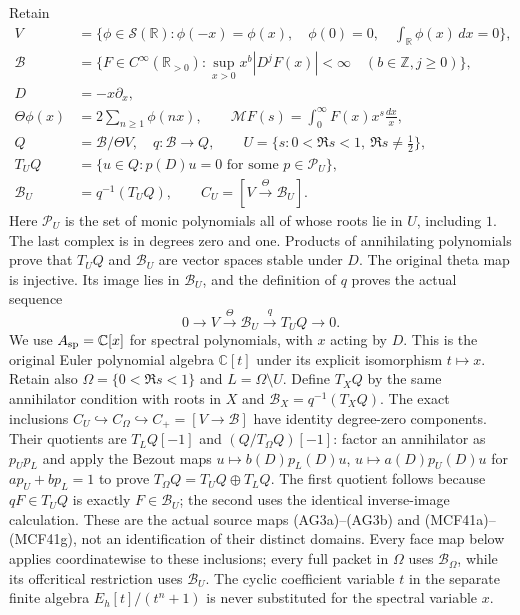 Retain
\[
\begin{split}
 V&=\{\phi\in\mathcal S(\mathbb R):\phi(-x)=\phi(x),\quad
       \phi(0)=0,\quad\textstyle\int_{\mathbb R}\phi(x)\,dx=0\},\\
 \mathscr B&=\{F\in C^\infty(\mathbb R_{>0}):
       \sup_{x>0}x^b|D^jF(x)|<\infty\quad(b\in\mathbb Z,j\ge0)\},\\
 D&=-x\partial_x,\\
 \Theta\phi(x)&=2\sum_{n\ge1}\phi(nx),\qquad
 \mathcal MF(s)=\int_0^\infty F(x)x^s\frac{dx}{x},\\
 Q&=\mathscr B/\Theta V,\quad q:\mathscr B\to Q,\qquad
 U=\{s:0<\Re s<1,\ \Re s\ne\tfrac12\},\\
 T_UQ&=\{u\in Q:p(D)u=0\text{ for some }p\in\mathcal P_U\},\\
 \mathscr B_U&=q^{-1}(T_UQ),\qquad C_U=[V\xrightarrow{\Theta}\mathscr B_U].
\end{split}                                                     \tag{CFA.1}
\]
Here $\mathcal P_U$ is the set of monic polynomials all of whose roots
lie in $U$, including $1$.  The last complex is in degrees zero and one.
Products of annihilating polynomials prove that $T_UQ$ and
$\mathscr B_U$ are vector spaces stable under $D$.  The original
theta map is injective.  Its image lies in $\mathscr B_U$, and the
definition of $q$ proves the actual sequence
\[
 0\longrightarrow V\xrightarrow{\Theta}\mathscr B_U
           \xrightarrow{q}T_UQ\longrightarrow0.                \tag{CFA.2}
\]
We use $A_{\rm sp}=\mathbb C[x]$ for spectral polynomials, with $x$
acting by $D$.  This is the original Euler polynomial algebra
$\mathbb C[t]$ under its explicit isomorphism $t\mapsto x$.
Retain also $\Omega=\{0<\Re s<1\}$ and
$L=\Omega\setminus U$. Define $T_XQ$ by the same annihilator
condition with roots in $X$ and $\mathscr B_X=q^{-1}(T_XQ)$.
The exact inclusions $C_U\hookrightarrow C_\Omega\hookrightarrow
C_+=[V\to\mathscr B]$ have identity degree-zero components.
Their quotients are $T_LQ[-1]$ and $(Q/T_\Omega Q)[-1]$:
factor an annihilator as $p_Up_L$ and apply the Bezout maps
$u\mapsto b(D)p_L(D)u$, $u\mapsto a(D)p_U(D)u$ for
$ap_U+bp_L=1$ to prove $T_\Omega Q=T_UQ\oplus T_LQ$.
The first quotient follows because $qF\in T_UQ$ is exactly
$F\in\mathscr B_U$; the second uses the identical inverse-image
calculation. These are the actual source maps (AG3a)--(AG3b) and
(MCF41a)--(MCF41g), not an identification of their distinct domains.
Every face map below applies coordinatewise to these inclusions;
every full packet in $\Omega$ uses $\mathscr B_\Omega$, while its
offcritical restriction uses $\mathscr B_U$.
The cyclic coefficient variable $t$ in the separate finite algebra
$E_h[t]/(t^n+1)$ is never substituted for the spectral variable $x$.

